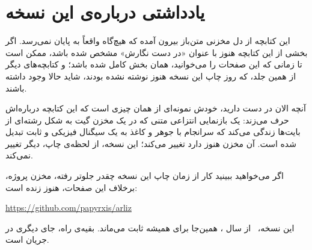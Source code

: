 \chapter*{یادداشتی درباره‌ی این نسخه}

این کتابچه از دل مخزنی متن‌باز بیرون آمده که هیچ‌گاه واقعاً به پایان
نمی‌رسد. اگر بخشی از این کتابچه هنوز با عنوان «در دست نگارش» مشخص
شده باشد، ممکن است تا زمانی که این صفحات را می‌خوانید، همان بخش کامل
شده باشد؛ و کتابچه‌های دیگر از همین جلد، که روز چاپ این نسخه هنوز
نوشته نشده بودند، شاید حالا وجود داشته باشند.

آنچه الان در دست دارید، خودش نمونه‌ای از همان چیزی است که این کتابچه
درباره‌اش حرف می‌زند: یک بازنمایی انتزاعی متنی که در یک مخزن گیت
به شکل رشته‌ای از بایت‌ها زندگی می‌کند که سرانجام با جوهر و کاغذ
به یک سیگنال فیزیکی و ثابت تبدیل شده است. آن مخزن هنوز دارد تغییر
می‌کند؛ این نسخه، از لحظه‌ی چاپ، دیگر تغییر نمی‌کند.

اگر می‌خواهید ببینید کار از زمان چاپ این نسخه چقدر جلوتر رفته، مخزن
پروژه، برخلاف این صفحات، هنوز زنده است:

\begin{center}
  \url{https://github.com/papyrxis/arliz}
\end{center}

این نسخه، \BookletEdition\ از سال \BookletYear، همین‌جا برای همیشه
ثابت می‌ماند. بقیه‌ی راه، جای دیگری در جریان است.